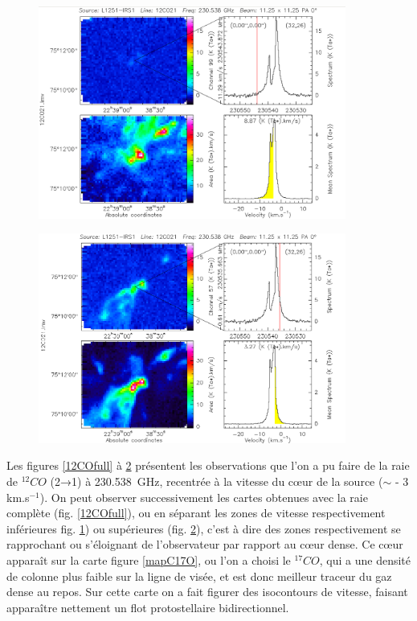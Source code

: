 \documentclass[a4paper,10pt,french]{article}
\begin{document}
\begin{figure}[ht]
    \centering
    \includegraphics[width=0.9\textwidth]{12COblue.png}
    \label{12COblue}
\end{figure}

\begin{figure}[ht]
    \centering
    \includegraphics[width=0.9\textwidth]{12COred.png}
    \label{12COred}
\end{figure}

Les figures \ref{12COfull} à \ref{12COred} présentent les observations que l'on a pu faire de la raie  de $^{12}CO$ (2→1) à       \SI{230.538}{\giga\hertz}, recentrée à la vitesse du cœur de la source ($\sim$ - 3 km.s$^{-1}$). On peut observer successivement les cartes obtenues avec la raie complète (fig. \ref{12COfull}), ou en séparant les zones de vitesse respectivement inférieures fig. \ref{12COblue}) ou supérieures (fig. \ref{12COred}), c'est à dire des zones respectivement se rapprochant ou s'éloignant de l'observateur par rapport au cœur dense. Ce cœur apparaît sur la carte figure     \ref{mapC17O}, ou l'on a choisi le $^{17}CO$, qui a une densité de colonne plus faible sur la ligne de visée, et est donc meilleur traceur du gaz dense au repos. Sur cette carte on a fait figurer des isocontours de vitesse, faisant apparaître nettement un flot protostellaire bidirectionnel.
\end{document}
